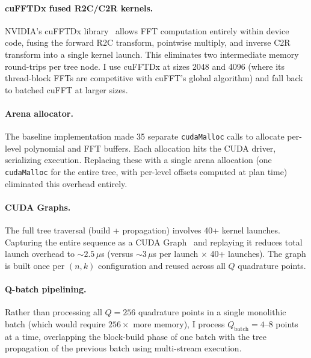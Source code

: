 \documentclass[11pt]{article}
\begin{document}
\paragraph{cuFFTDx fused R2C/C2R kernels.}
NVIDIA's cuFFTDx library~\citep{nvidia2024cufftdx} allows FFT
computation entirely within device code, fusing the forward R2C
transform, pointwise multiply, and inverse C2R transform into a single
kernel launch. This eliminates two intermediate memory round-trips per
tree node. I use cuFFTDx at sizes 2048 and 4096 (where its thread-block
FFTs are competitive with cuFFT's global algorithm) and fall back to
batched cuFFT at larger sizes.

\paragraph{Arena allocator.}
The baseline implementation made 35 separate \texttt{cudaMalloc} calls to
allocate per-level polynomial and FFT buffers. Each allocation hits the
CUDA driver, serializing execution. Replacing these with a single arena
allocation (one \texttt{cudaMalloc} for the entire tree, with per-level
offsets computed at plan time) eliminated this overhead entirely.

\paragraph{CUDA Graphs.}
The full tree traversal (build + propagation) involves 40+ kernel
launches. Capturing the entire sequence as a CUDA
Graph~\citep{nvidia2024cudagraphs} and replaying it reduces total launch
overhead to ${\sim}2.5\,\mu$s (versus ${\sim}3\,\mu$s per launch
$\times$ 40+ launches). The graph is built once per $(n, k)$
configuration and reused across all $Q$ quadrature points.

\paragraph{Q-batch pipelining.}
Rather than processing all $Q = 256$ quadrature points in a single
monolithic batch (which would require $256 \times$ more memory), I
process $Q_{\text{batch}} = 4$--$8$ points at a time, overlapping the
block-build phase of one batch with the tree propagation of the previous
batch using multi-stream execution.
\end{document}
